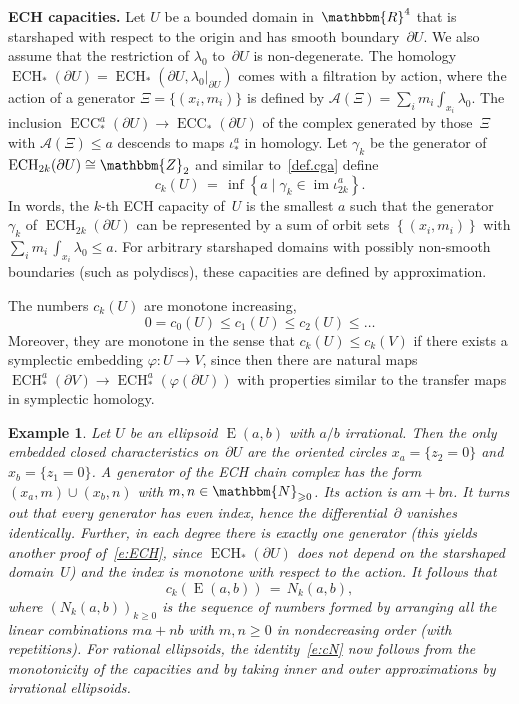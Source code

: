 \documentclass[12pt,twoside]{amsart}
\def\ECH{\operatorname{ECH}}
\theoremstyle{plain}
\newtheorem{example}[theorem]{Example}
\numberwithin{figure}{section}
\numberwithin{equation}{section}
\def\im{\operatorname {im}}
\def\ECC{\operatorname{ECC}}
\def\ECH{\operatorname{ECH}}
\def\gg{\gamma}
\def\gf{\varphi}
\def\E{\operatorname{E}}
\def\ca{{\mathcal A}}
\def\NN{\mathbbm{N}}
\def\RR{\mathbbm{R}}
\def\ZZ{\mathbbm{Z}}
\def\pp{\partial}
\def\ni{\noindent}
\def\b{\bigskip}
\begin{document}
\b \ni
{\bf ECH capacities.}
Let $U$ be a bounded domain in~$\RR^4$ that is starshaped with respect to the origin and
has smooth boundary~$\pp U$.
We also assume that the restriction of $\lambda_0$ to~$\pp U$ is non-degenerate.
%
The homology $\ECH_* (\pp U) = \ECH_*(\pp U,\lambda_0 |_{\partial U})$ 
comes with a filtration by action, where the action of a generator $\Xi = \{ (x_i,m_i) \}$
is defined by $\ca (\Xi) = \sum_i m_i \int_{x_i} \lambda_0$.
The inclusion $\ECC_*^a(\pp U) \to \ECC_*(\pp U)$ of the complex generated by those~$\Xi$
with $\ca (\Xi) \leqslant a$ descends to maps $\iota^a_*$ in homology. 
Let $\gg_k$ be the generator of $\ECH_{2k}(\pp U) \cong \ZZ_2$
and similar to~\eqref{def.cga} define
%
\begin{equation} \label{def.ck}
c_k(U) \,=\, \inf \left\{ a \mid \gg_k \in \im \iota^a_{2k} \right\}.
\end{equation}
In words, the $k$-th ECH capacity of~$U$ is the smallest $a$ such that the generator~$\gg_k$ of $\ECH_{2k}(\pp U)$
can be represented by a sum of orbit sets $\left\{ (x_i,m_i) \right\}$
with $\sum_i m_i \, \int_{x_i}\lambda_0 \leqslant a$.
%
For arbitrary starshaped domains with possibly non-smooth boundaries (such as polydiscs), 
these capacities are defined by approximation.

The numbers $c_k (U)$ are monotone increasing, 
$$
0 = c_0 (U) \leqslant c_1(U) \leqslant c_2(U) \leqslant \dots
$$
Moreover, they are monotone in the sense that $c_k(U) \leqslant c_k(V)$
if there exists a symplectic embedding $\gf \colon U \to V$,
since then there are natural maps $\ECH_*^a (\pp V) \to \ECH_*^a (\gf (\pp U))$
with properties similar to the transfer maps in symplectic homology.


\begin{example} \label{ex:ellECH}
{\rm
Let $U$ be an ellipsoid $\E (a,b)$ with $a/b$ irrational.
Then the only embedded closed characteristics on~$\pp U$ are the oriented circles $x_a = \{z_2=0\}$ and $x_b = \{z_1=0\}$.
A generator of the ECH chain complex has the form $(x_a,m) \cup (x_b,n)$ with $m,n \in \NN_{\geqslant 0}$.
Its action is $am+bn$.
It turns out that every generator has even index, hence the differential~$\pp$ vanishes identically.
Further, in each degree there is exactly one generator
(this yields another proof of~\eqref{e:ECH}, since $\ECH_*(\pp U)$ does not depend on the starshaped domain~$U$)
and the index is monotone with respect to the action. 
It follows that 
\begin{equation} \label{e:cN}
c_k (\E(a,b)) \,=\, N_k(a,b) ,
\end{equation}
where $(N_k(a,b))_{k \geqslant 0}$ is the sequence of numbers formed by arranging all the linear combinations 
$ma + nb$ with $m,n \geqslant 0$ in nondecreasing order (with repetitions). 
%
For rational ellipsoids, the identity~\eqref{e:cN} now follows from the monotonicity of the capacities and by taking inner
and outer approximations by irrational ellipsoids.
}
\end{example}
\end{document}
